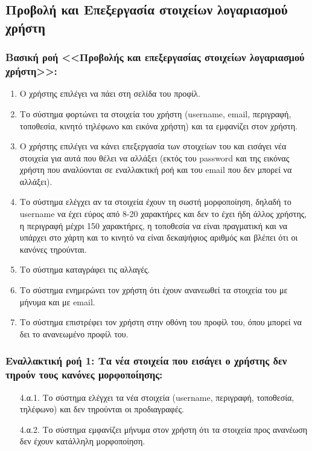 \documentclass[12pt,a4paper]{article}
\begin{document}
\subsection{Προβολή και Επεξεργασία στοιχείων λογαριασμού χρήστη}

\subsubsection*{Βασική ροή <<Προβολής και επεξεργασίας στοιχείων λογαριασμού \\χρήστη>>:}
\begin{enumerate}
    \item Ο χρήστης επιλέγει να πάει στη σελίδα του προφίλ. 
    \item Το σύστημα φορτώνει τα στοιχεία του χρήστη (username, email, περιγραφή, τοποθεσία, κινητό τηλέφωνο και εικόνα χρήστη) και τα εμφανίζει στον χρήστη.
    \item Ο χρήστης επιλέγει να κάνει επεξεργασία των στοιχείων του και εισάγει νέα στοιχεία για αυτά που θέλει να αλλάξει (εκτός του password και της εικόνας χρήστη που αναλύονται σε εναλλακτική ροή και του email που δεν μπορεί να αλλάξει). 
    \item Το σύστημα ελέγχει αν τα στοιχεία έχουν τη σωστή μορφοποίηση, δηλαδή το username να έχει εύρος από 8-20 χαρακτήρες και δεν το έχει ήδη άλλος χρήστης, η περιγραφή μέχρι 150 χαρακτήρες, η τοποθεσία να είναι πραγματική και να υπάρχει στο χάρτη και το κινητό να είναι δεκαψήφιος αριθμός και βλέπει ότι οι κανόνες τηρούνται.
    \item Το σύστημα καταγράφει τις αλλαγές.
    \item Το σύστημα ενημερώνει τον χρήστη ότι έχουν ανανεωθεί τα στοιχεία του με μήνυμα και με email.
    \item Το σύστημα επιστρέφει τον χρήστη στην οθόνη του προφίλ του, όπου μπορεί να δει το ανανεωμένο προφίλ του.
\end{enumerate}

\subsubsection*{Εναλλακτική ροή 1: Τα νέα στοιχεία που εισάγει ο χρήστης δεν τηρούν τους κανόνες μορφοποίησης:}
\begin{enumerate}
    \item [4.α.1.] Το σύστημα ελέγχει τα νέα στοιχεία (username, περιγραφή, τοποθεσία, τηλέφωνο) και δεν τηρούνται οι προδιαγραφές.
    \item [4.α.2.] Το σύστημα εμφανίζει μήνυμα στον χρήστη ότι τα στοιχεία προς ανανέωση δεν έχουν κατάλληλη μορφοποίηση.
\end{enumerate}
\end{document}
